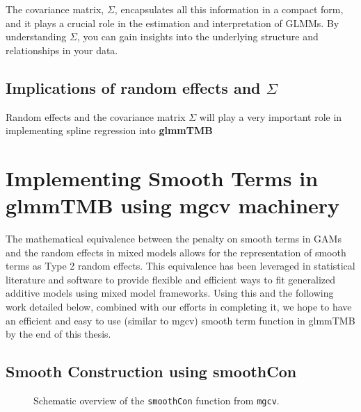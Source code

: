 \documentclass[12pt, twoside,hidelinks]{article}
\theoremstyle{definition}
\numberwithin{equation}{section}
\begin{document}
The covariance matrix, $\Sigma$, encapsulates all this information in a compact form, and it plays a crucial role in the estimation and interpretation of GLMMs. By understanding \( \Sigma \), you can gain insights into the underlying structure and relationships in your data.

\subsection{Implications of random effects and \(\Sigma\)}

Random effects and the covariance matrix $\Sigma$ will play a very important role in implementing spline regression into \textbf{glmmTMB}


\section{Implementing Smooth Terms in glmmTMB using mgcv machinery}

The mathematical equivalence between the penalty on smooth terms in GAMs and the random effects in mixed models allows for the representation of smooth terms as Type 2 random effects. This equivalence has been leveraged in statistical literature and software to provide flexible and efficient ways to fit generalized additive models using mixed model frameworks. Using this and the following work detailed below, combined with our efforts in completing it, we hope to have an efficient and easy to use (similar to mgcv) smooth term function in glmmTMB by the end of this thesis. 

\subsection{Smooth Construction using smoothCon}



\begin{figure}[h]
\centering
{}
\caption{Schematic overview of the \texttt{smoothCon} function from \texttt{mgcv}.}
\end{figure}
\end{document}
